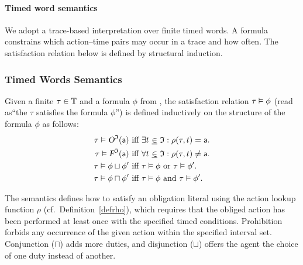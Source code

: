 \paragraph{Timed word semantics \TDDLfm}\label{sec:semantics}

We adopt a trace-based interpretation over finite timed words. A formula constrains which action–time pairs may occur in a trace and how often. The satisfaction relation below is defined by structural induction.




\subsubsection{Timed Words Semantics}\label{subsec:timed-words-semantics}
\begin{definition}\label{def:satisfaction-relation}
Given a finite \timedword $\tau \in \mathbb{T}$ and a formula $\phi$ from \TDDLfm, the satisfaction relation $\tau \vDash  \phi$ (read as``the \timedword $\tau$ satisfies the formula $\phi$'') is defined inductively on the structure of the formula $\phi$ as follows:
    \begin{align}
   \tau \vDash  \textsl{O}^{\mathfrak{I}}(\mathsf{a})
    &\text{ iff } \exists t ~\underline{\in}~ \mathfrak{I}: \rho(\tau,t) = \mathsf{a} . \label{obis}\\
	\tau \vDash  \textsl{F}^{\mathfrak{I}}(\mathsf{a})
	&\text{ iff } \forall t ~\underline{\in}~ \mathfrak{I}: \rho(\tau,t) \neq \mathsf{a} . \label{fis}\\
	\tau \vDash  \phi \sqcup \phi'
	&\text{ iff } \tau \vDash  \phi \text{ or } \tau \vDash  \phi'.\\
	\tau \vDash  \phi \sqcap \phi'
	&\text{ iff } \tau \vDash  \phi \text{ and } \tau \vDash  \phi'.
\end{align}
\end{definition}

The semantics defines how to satisfy an obligation literal using the action lookup function $\rho$ (cf.\ Definition~\ref{defrho}), which requires that the obliged action has been performed at least once with the specified timed conditions.  Prohibition forbids any occurrence of the given action within the specified interval set. 
Conjunction ($\sqcap$) adds more duties, and disjunction ($\sqcup$) offers the agent the choice of one duty instead of another.



